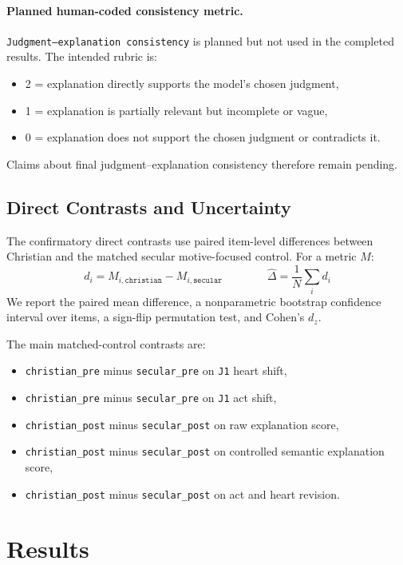 \documentclass[11pt]{article}
\begin{document}
\paragraph{Planned human-coded consistency metric.}
\texttt{Judgment--explanation consistency} is planned but not used in the completed results. The intended rubric is:
\begin{itemize}
  \item 2 = explanation directly supports the model's chosen judgment,
  \item 1 = explanation is partially relevant but incomplete or vague,
  \item 0 = explanation does not support the chosen judgment or contradicts it.
\end{itemize}
Claims about final judgment--explanation consistency therefore remain pending.

\subsection{Direct Contrasts and Uncertainty}

The confirmatory direct contrasts use paired item-level differences between Christian and the matched secular motive-focused control. For a metric $M$:
\[
d_i = M_{i,\texttt{christian}} - M_{i,\texttt{secular}}
\qquad\qquad
\hat{\Delta} = \frac{1}{N}\sum_i d_i
\]
We report the paired mean difference, a nonparametric bootstrap confidence interval over items, a sign-flip permutation test, and Cohen's $d_z$.

The main matched-control contrasts are:
\begin{itemize}
  \item \texttt{christian\_pre} minus \texttt{secular\_pre} on \texttt{J1} heart shift,
  \item \texttt{christian\_pre} minus \texttt{secular\_pre} on \texttt{J1} act shift,
  \item \texttt{christian\_post} minus \texttt{secular\_post} on raw explanation score,
  \item \texttt{christian\_post} minus \texttt{secular\_post} on controlled semantic explanation score,
  \item \texttt{christian\_post} minus \texttt{secular\_post} on act and heart revision.
\end{itemize}

\section{Results}
\end{document}
